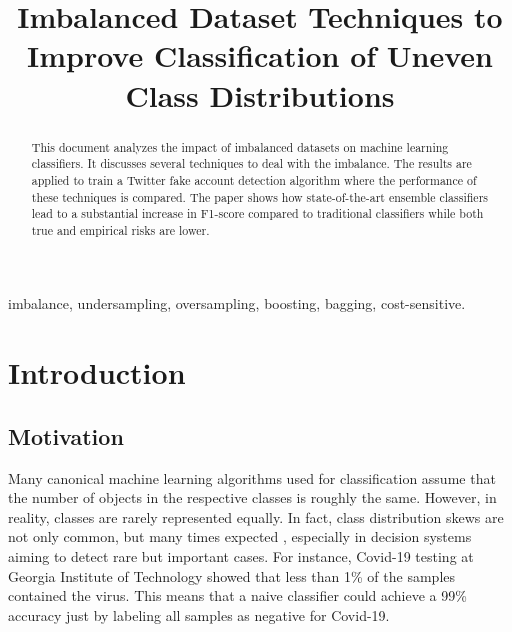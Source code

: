 \documentclass[conference]{IEEEtran}
\begin{document}
\title{Imbalanced Dataset Techniques to Improve Classification of Uneven Class Distributions\\
}

\author{
\and
{}
\and
{}
}

\maketitle

\begin{abstract}
This document analyzes the impact of imbalanced datasets on machine learning classifiers. It discusses several techniques to deal with the imbalance. The results are applied to train a Twitter fake account detection algorithm where the performance of these techniques is compared. The paper shows how state-of-the-art ensemble classifiers lead to a substantial increase in F1-score compared to traditional classifiers while both true and empirical risks are lower.
\end{abstract}

\begin{IEEEkeywords}
imbalance, undersampling, oversampling, boosting, bagging, cost-sensitive.
\end{IEEEkeywords}

\section{Introduction}
	\subsection{Motivation}
	Many canonical machine learning algorithms used for classification assume that the number of objects in the respective classes is roughly the same. However, in reality, classes are rarely represented equally. In fact, class distribution skews are not only common, but many times expected \cite{data_imbalance_overview}, especially in decision systems aiming to detect rare but important cases. For instance, Covid-19 testing at Georgia Institute of Technology showed that less than 1\% of the samples contained the virus. This means that a naive classifier could achieve a 99\% accuracy just by labeling all samples as negative for Covid-19.
	
\end{document}
